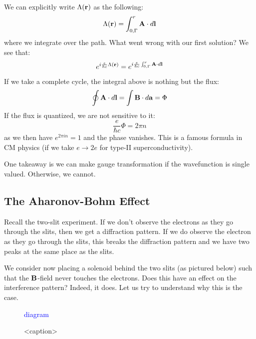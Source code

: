 We can explicitly write $\Lambda(\mathbf{r})$ as the following:
\begin{equation}
    \Lambda(\mathbf{r}) = \int_{0, \Gamma}^r \mathbf{A} \cdot d\mathbf{l}
\end{equation}
where we integrate over the path. What went wrong with our first solution? We see that:
\begin{equation}
    e^{i\frac{e}{\hbar c}\Lambda(\mathbf{r})} = e^{i\frac{e}{\hbar c}\int_{0, \Gamma}^r \mathbf{A} \cdot d\mathbf{l}}
\end{equation}

If we take a complete cycle, the integral above is nothing but the flux:
\begin{equation}
    \oint \mathbf{A} \cdot d\mathbf{l} = \int \mathbf{B} \cdot d\mathbf{a} = \Phi
\end{equation}
If the flux is quantized, we are not sensitive to it:
\begin{equation}
    \frac{e}{\hbar c}\Phi = 2\pi n
\end{equation}
as we then have $e^{2\pi i n} = 1$ and the phase vanishes. This is a famous formula in CM physics (if we take $e \to 2e$ for type-II superconductivity).

One takeaway is we can make gauge transformation if the wavefunction is single valued. Otherwise, we cannot.

\subsection{The Aharonov-Bohm Effect}
Recall the two-slit experiment. If we don't observe the electrons as they go through the slits, then we get a diffraction pattern. If we do observe the electron as they go through the slits, this breaks the diffraction pattern and we have two peaks at the same place as the slits.

We consider now placing a solenoid behind the two slits (as pictured below) such that the $\mathbf{B}$-field never touches the electrons. Does this have an effect on the interference pattern? Indeed, it does. Let us try to understand why this is the case. 

\begin{figure}[htbp]
    \centering
    \textcolor{blue}{diagram}
    \caption{<caption>}
    \label{<label>}
\end{figure}

